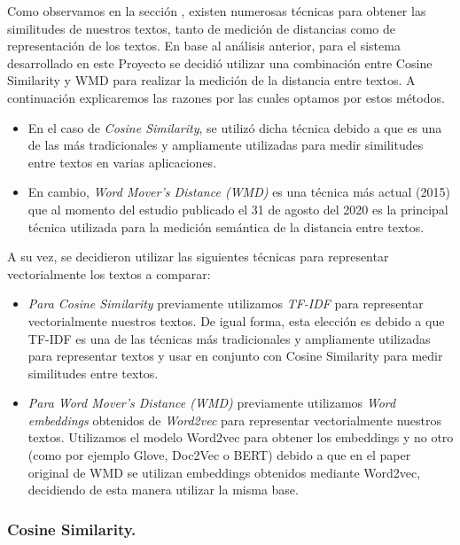 \documentclass[12pt,a4paper]{article}
\begin{document}
\begin{sloppypar}
Como observamos en la sección \textit{}, existen numerosas técnicas para obtener las similitudes de nuestros textos, tanto de medición de distancias como de representación de los textos. En base al análisis anterior, para el sistema desarrollado en este Proyecto se decidió utilizar una combinación entre Cosine Similarity y WMD para realizar la medición de la distancia entre textos. A continuación explicaremos las razones por las cuales optamos por estos métodos.
\begin{itemize}
\item En el caso de \textit{Cosine Similarity}, se utilizó dicha técnica debido a que es una de las más tradicionales y ampliamente utilizadas para medir similitudes entre textos en varias aplicaciones\cite{similarity_survey, cosine_sim_1, cosine_sim_2, cosine_sim_3}.
\item En cambio, \textit{Word Mover’s Distance (WMD)} es una técnica más actual (2015)\cite{wmd_paper} que al momento del estudio publicado el 31 de agosto del 2020\cite{similarity_survey} es la principal técnica utilizada para la medición semántica de la distancia entre textos.
\end{itemize}

A su vez, se decidieron utilizar las siguientes técnicas para representar vectorialmente los textos a comparar:
\begin{itemize}
\item \textit{Para Cosine Similarity} previamente utilizamos \textit{TF-IDF} para representar vectorialmente nuestros textos. De igual forma, esta elección es debido a que TF-IDF es una de las técnicas más tradicionales y ampliamente utilizadas para representar textos y usar en conjunto con Cosine Similarity para medir similitudes entre textos\cite{similarity_survey}. 
\item \textit{Para Word Mover’s Distance (WMD)} previamente utilizamos \textit{Word embeddings} obtenidos de \textit{Word2vec} para representar vectorialmente nuestros textos. Utilizamos el modelo Word2vec para obtener los embeddings y no otro (como por ejemplo Glove, Doc2Vec o BERT) debido a que en el paper original de WMD\cite{wmd_paper} se utilizan embeddings obtenidos mediante Word2vec, decidiendo de esta manera utilizar la misma base.
\end{itemize}

\cleardoublepage

\subsubsection{Cosine Similarity.}\label{cosine}


\end{sloppypar}
\end{document}
